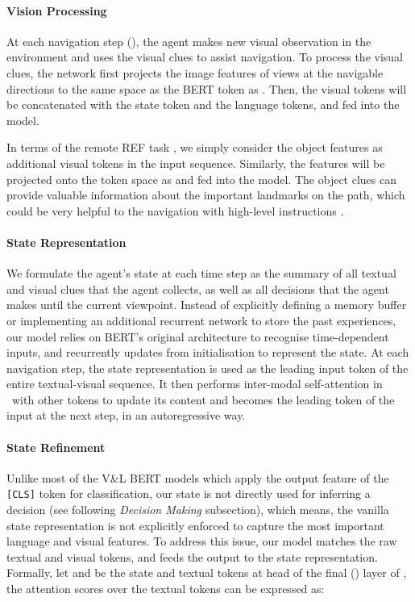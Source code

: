 \documentclass[final]{cvpr}
\begin{document}
\vspace{-14pt}
\paragraph{Vision Processing}
At each navigation step (), the agent makes new visual observation in the environment and uses the visual clues to assist navigation. To process the visual clues, the network first projects the image features of views at the navigable directions  to the same space as the BERT token as . Then, the visual tokens will be concatenated with the state token and the language tokens, and fed into the model.

In terms of the remote REF task \cite{qi2020reverie}, we simply consider the object features  as additional visual tokens in the input sequence. Similarly, the features will be projected onto the token space as  and fed into the model. The object clues can provide valuable information about the important landmarks on the path, which could be very helpful to the navigation with high-level instructions \cite{qi2020reverie}.



\vspace{-14pt}
\paragraph{State Representation} 
We formulate the agent's state at each time step  as the summary of all textual and visual clues that the agent collects, as well as all decisions that the agent makes until the current viewpoint. Instead of explicitly defining a memory buffer \cite{zhu2020babywalk} or implementing an additional recurrent network \cite{hochreiter1997long} to store the past experiences, our model relies on BERT's original architecture to recognise time-dependent inputs, and recurrently updates  from initialisation to represent the state.
At each navigation step, the state representation is used as the leading input token of the entire textual-visual sequence. It then performs inter-modal self-attention in \vlnbert~with other tokens to update its content and becomes the leading token of the input at the next step, in an autoregressive way.

\vspace{-14pt}
\paragraph{State Refinement} 
Unlike most of the V\&L BERT models which apply the output feature of the \texttt{[CLS]} token for classification, our state is not directly used for inferring a decision (see following \textit{Decision Making} subsection), which means, the vanilla state representation is not explicitly enforced to capture the most important language and visual features. To address this issue, our model matches the raw textual and visual tokens, and feeds the output to the state representation. Formally, let  and  be the state and textual tokens at head  of the final () layer of \vlnbert, the attention scores over the textual tokens can be expressed as:
\end{document}
